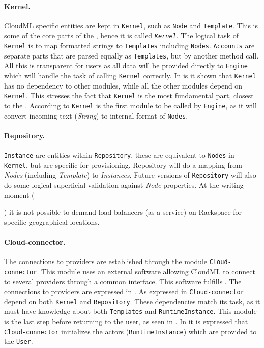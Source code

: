 \paragraph{Kernel.} 

CloudML specific entities are kept in \texttt{Kernel},
such as \texttt{Node} and \texttt{Template}.
This is some of the core parts of the , hence it is called \emph{\texttt{Kernel}}.
The logical task of \texttt{Kernel} is to map  formatted strings to 
\texttt{Templates} including \texttt{Nodes}.
\texttt{Accounts} are separate parts that are parsed equally as \texttt{Templates},
 but by another method call. All this is transparent for users as all data will
be provided directly to \texttt{Engine} which will handle the task
of calling \texttt{Kernel} correctly.
In  is it shown that \texttt{Kernel}
has no dependency to other modules, while all the other modules depend on \texttt{Kernel}.
This stresses the fact that \texttt{Kernel} is the most fundamental part,
closest to the .
According to  \texttt{Kernel} is the first module
to be called by \texttt{Engine}, as it will convert incoming text (\emph{String})
to internal format of \texttt{Nodes}.

\paragraph{Repository.} 

\texttt{Instance} are entities within \texttt{Repository},
these are equivalent to \texttt{Nodes} in \texttt{Kernel},
but are specific for provisioning.
Repository will do a mapping from \emph{Nodes} (including \emph{Template})
to \emph{Instances}. Future versions of \texttt{Repository} will also do some logical superficial validation
against \emph{Node} properties.
At the writing moment (\date{April 2012}) it is not possible to 
demand load balancers (as a service) on Rackspace for specific geographical locations.

\paragraph{Cloud-connector.}

The connections to providers are established through the module \texttt{Cloud-connector}.
This module uses an external software allowing CloudML to connect to several providers
through a common interface.
This software fulfills .
The connections to providers are expressed in .
As expressed in  \texttt{Cloud-connector}
depend on both \texttt{Kernel} and \texttt{Repository}.
These dependencies match its task, as it must have knowledge about both 
\texttt{Templates} and \texttt{RuntimeInstance}.
This module is the last step before returning to the user, as seen in .
In  it is expressed that \texttt{Cloud-connector} initializes
the actors (\texttt{RuntimeInstance}) which are provided to the \texttt{User}.
